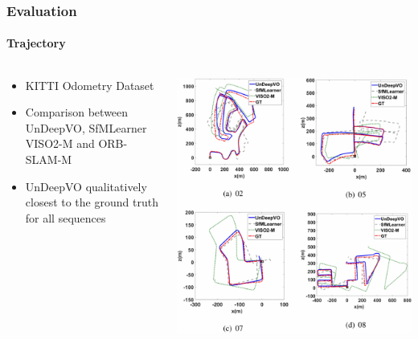 \begin{frame}
    \frametitle{Evaluation}
    \framesubtitle{Trajectory}
	       \begin{columns}
	       	\begin{column}{0.48\textwidth}
	       		\begin{itemize}
	       			\item KITTI Odometry Dataset 
	       			\item Comparison between UnDeepVO, SfMLearner VISO2-M and ORB-SLAM-M
	       			\item UnDeepVO qualitatively closest to the ground truth for all sequences
	       		\end{itemize}
	       	\end{column}
	       	\begin{column}{0.48\textwidth}
	       	\vspace{-.5cm}
	    	\includegraphics[width=\linewidth]{images/trajectory-eval.png}
	       	\end{column}
	       \end{columns} 

\end{frame}

